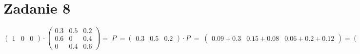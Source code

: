 \documentclass{article}
\begin{document}
\section*{Zadanie 8}
\begin{dmath*}
\begin{pmatrix}
1 & 0 & 0
\end{pmatrix}
\cdot{}
\begin{pmatrix}
0.3 & 0.5 & 0.2 \\
0.6 & 0 & 0.4 \\
0 & 0.4 & 0.6
\end{pmatrix}
=\;P\;=
\begin{pmatrix}
0.3 & 0.5 & 0.2
\end{pmatrix}
\cdot{P}\;=\;
\begin{pmatrix}
0.09+0.3 & 0.15 + 0.08 & 0.06 + 0.2 + 0.12
\end{pmatrix}
=
\begin{pmatrix}
0.09 & 0.23 & 0.38
\end{pmatrix}
\end{dmath*}
\end{document}
